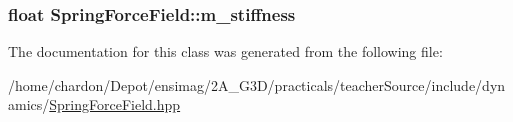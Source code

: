 \hypertarget{classSpringForceField_a19fa7376f0067977dfbda789172c730b}{
\subsubsection[{m\+\_\+stiffness}]{\setlength{\rightskip}{0pt plus 5cm}float Spring\+Force\+Field\+::m\+\_\+stiffness\hspace{0.3cm}{\ttfamily [private]}}}\label{classSpringForceField_a19fa7376f0067977dfbda789172c730b}


The documentation for this class was generated from the following file\+:\begin{DoxyCompactItemize}
\item 
/home/chardon/\+Depot/ensimag/2\+A\+\_\+\+G3\+D/practicals/teacher\+Source/include/dynamics/\hyperlink{SpringForceField_8hpp}{Spring\+Force\+Field.\+hpp}\end{DoxyCompactItemize}
